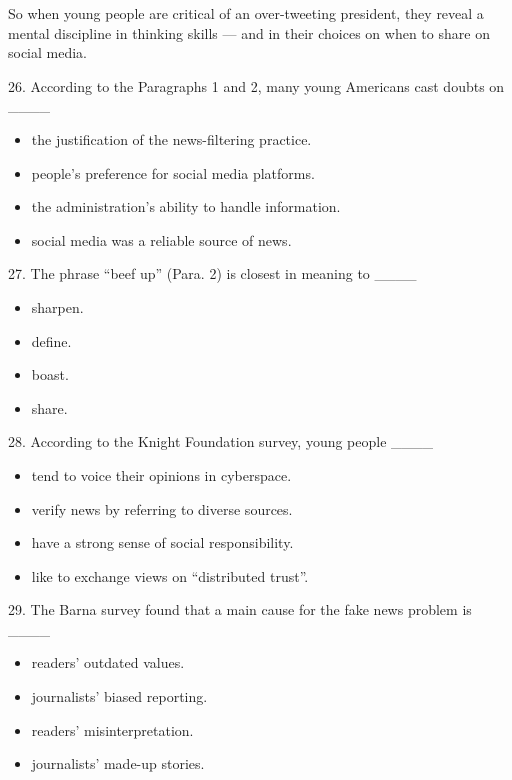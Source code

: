 \documentclass[UTF8,11pt]{ctexart}
\begin{document}
So when young people are critical of an over-tweeting president, they reveal a mental discipline in thinking skills — and in their choices on when to share on social media.


26. According to the Paragraphs 1 and 2, many young Americans cast doubts on \_\_\_\_


\begin{itemize}[leftmargin=2em,itemsep=.2em,topsep=.4em]\item[A.] the justification of the news-filtering practice.
\item[B.] people’s preference for social media platforms.
\item[C.] the administration’s ability to handle information.
\item[D.] social media was a reliable source of news.
\end{itemize}

27. The phrase “beef up” (Para. 2) is closest in meaning to \_\_\_\_


\begin{itemize}[leftmargin=2em,itemsep=.2em,topsep=.4em]\item[A.] sharpen.
\item[B.] define.
\item[C.] boast.
\item[D.] share.
\end{itemize}

28. According to the Knight Foundation survey, young people \_\_\_\_


\begin{itemize}[leftmargin=2em,itemsep=.2em,topsep=.4em]\item[A.] tend to voice their opinions in cyberspace.
\item[B.] verify news by referring to diverse sources.
\item[C.] have a strong sense of social responsibility.
\item[D.] like to exchange views on “distributed trust”.
\end{itemize}

29. The Barna survey found that a main cause for the fake news problem is \_\_\_\_


\begin{itemize}[leftmargin=2em,itemsep=.2em,topsep=.4em]\item[A.] readers’ outdated values.
\item[B.] journalists’ biased reporting.
\item[C.] readers’ misinterpretation.
\item[D.] journalists’ made-up stories.
\end{itemize}
\end{document}

